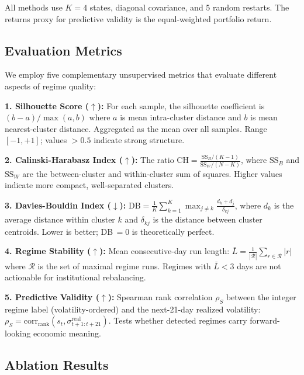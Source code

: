 All methods use $K\!=\!4$ states, diagonal covariance, and 5 random restarts. The returns proxy for predictive validity is the equal-weighted portfolio return.

\subsection{Evaluation Metrics}

We employ five complementary unsupervised metrics that evaluate different aspects of regime quality:

\textbf{1. Silhouette Score ($\uparrow$):} For each sample, the silhouette coefficient is $(b-a)/\max(a,b)$ where $a$ is mean intra-cluster distance and $b$ is mean nearest-cluster distance. Aggregated as the mean over all samples. Range $[-1, +1]$; values $>0.5$ indicate strong structure.

\textbf{2. Calinski-Harabasz Index ($\uparrow$):} The ratio $\text{CH} = \frac{\text{SS}_B / (K-1)}{\text{SS}_W / (N-K)}$, where $\text{SS}_B$ and $\text{SS}_W$ are the between-cluster and within-cluster sum of squares. Higher values indicate more compact, well-separated clusters.

\textbf{3. Davies-Bouldin Index ($\downarrow$):} $\text{DB} = \frac{1}{K}\sum_{k=1}^{K} \max_{j \neq k} \frac{d_k + d_j}{\delta_{kj}}$, where $d_k$ is the average distance within cluster $k$ and $\delta_{kj}$ is the distance between cluster centroids. Lower is better; DB$\,=0$ is theoretically perfect.

\textbf{4. Regime Stability ($\uparrow$):} Mean consecutive-day run length: $\bar{L} = \frac{1}{|\mathcal{R}|}\sum_{r \in \mathcal{R}} |r|$ where $\mathcal{R}$ is the set of maximal regime runs. Regimes with $\bar{L} < 3$ days are not actionable for institutional rebalancing.

\textbf{5. Predictive Validity ($\uparrow$):} Spearman rank correlation $\rho_S$ between the integer regime label (volatility-ordered) and the next-21-day realized volatility: $\rho_S = \text{corr}_{\text{rank}}(s_t, \sigma_{t+1:t+21}^{\text{real}})$. Tests whether detected regimes carry forward-looking economic meaning.

\subsection{Ablation Results}

